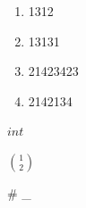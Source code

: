     \begin{enumerate}
        \item 1312
        \item 13131
        \item 21423423
        \item 2142134
    \end{enumerate}


    $int$

    $\binom{1}{2} $

    \# \_